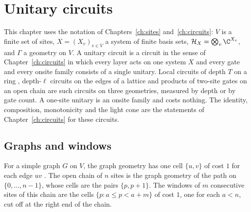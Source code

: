\chapter{Unitary circuits}
\label{ch:unitary_circuits}

This chapter uses the notation of Chapters~\ref{ch:sites} and~\ref{ch:circuits}:
$V$ is a finite set of sites, $X=(X_v)_{v\in V}$ a system of finite basis sets,
$\mathcal H_X=\bigotimes_v\C^{X_v}$, and $\Gamma$ a geometry on $V$. A unitary
circuit is a circuit in the sense of Chapter~\ref{ch:circuits} in which every
layer acts on one system $X$ and every gate and every onsite family consists of
a single unitary. Local circuits of depth $T$ on a ring
\cite{Malz2024Preparation}, depth-$\ell$ circuits on the edges of a lattice
\cite{Piroli2021LOCC} and products of two-site gates on an open chain are such
circuits on three geometries, measured by depth or by gate count. A one-site
unitary is an onsite family and costs nothing. The identity, composition,
monotonicity and the light cone are the statements of
Chapter~\ref{ch:circuits} for these circuits.

\section{Graphs and windows}
\label{sec:unitary_graph_geometry}

\begin{definition}
    \label{def:unitary_graph_geometry}
    \leanok
    For a simple graph $G$ on $V$, the graph geometry has one cell $\{u,v\}$ of
    cost $1$ for each edge $uv$ \cite{Piroli2021LOCC}. The open chain of $n$ sites
    is the graph geometry of the path on $\{0,\dots,n-1\}$, whose cells are the
    pairs $\{p,p+1\}$. The windows of $m$ consecutive sites of this chain are the
    cells $\{p: a\le p<a+m\}$ of cost $1$, one for each $a<n$, cut off at the
    right end of the chain.
\end{definition}

